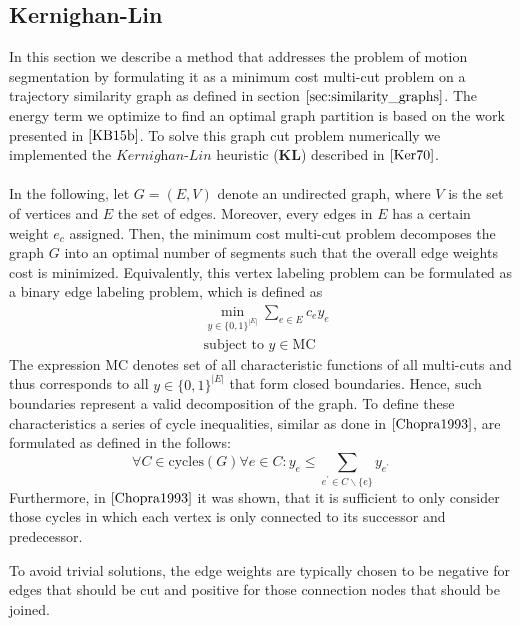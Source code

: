\subsection{Kernighan-Lin} 
In this section we describe a method that addresses the problem of motion segmentation by formulating it as a minimum cost multi-cut problem on a trajectory similarity graph as defined in section $\ref{sec:similarity_graphs}$. The energy term we optimize to find an optimal graph partition is based on the work presented in $\cite{KB15b}$. To solve this graph cut problem numerically we implemented the $\textit{Kernighan-Lin}$ heuristic ($\textbf{KL}$) described in $\cite{Ker70}$. \\ \\
In the following, let $G = (E, V)$ denote an undirected graph, where $V$ is the set of vertices and $E$ the set of edges. Moreover, every edges in $E$ has a certain weight $e_c$ assigned. Then, the minimum cost multi-cut problem decomposes the graph $G$ into an optimal number of segments such that the overall edge weights cost is minimized. Equivalently, this vertex labeling problem can be formulated as a binary edge labeling problem, which is defined as
\begin{equation}
\begin{aligned}
& \min_{y \in \{0,1 \}^{|E|}} \sum_{e \in E} c_e y_e \\
& \text{subject to } y \in \text{MC}
\end{aligned}
\end{equation}
The expression $\text{MC}$ denotes set of all characteristic functions of all multi-cuts and thus corresponds to all $y \in \{0,1 \}^{|E|}$ that form closed boundaries. Hence, such boundaries represent a valid decomposition of the graph. To define these characteristics a series of cycle inequalities, similar as done in $\cite{Chopra1993}$, are formulated as defined in the follows:
\begin{equation}
	\forall C \in \text{cycles}(G) \forall e \in C: y_e \leq \sum_{e^{'} \in C \backslash \{e\}} y_{e^{'}}
\end{equation}
Furthermore, in $\cite{Chopra1993}$ it was shown, that it is sufficient to only consider those cycles in which each vertex is only connected to its successor and predecessor.



To avoid trivial solutions, the edge weights are typically chosen to be negative for edges that should be cut and positive for those connection nodes that should be joined. \\ \\



